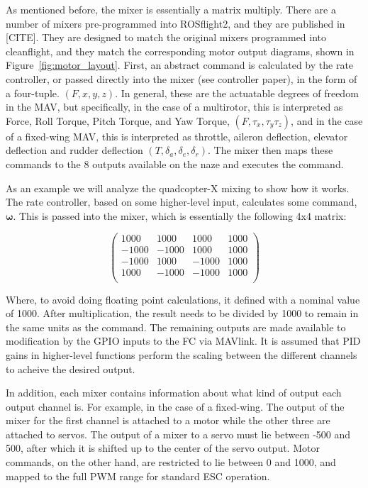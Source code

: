 \documentclass[paper=a4, fontsize=11pt]{scrartcl} %
\numberwithin{equation}{section} %
\numberwithin{figure}{section} %
\numberwithin{table}{section} %
\begin{document}
As mentioned before, the mixer is essentially a matrix multiply.  There are a number of mixers pre-programmed into ROSflight2, and they are published in [CITE].  They are designed to match the original mixers programmed into cleanflight, and they match the corresponding motor output diagrams, shown in Figure~\ref{fig:motor_layout}. First, an abstract command is calculated by the rate controller, or passed directly into the mixer (see controller paper), in the form of a four-tuple.  $(F, x, y, z)$.  In general, these are the actuatable degrees of freedom in the MAV, but specifically, in the case of a multirotor, this is interpreted as Force, Roll Torque, Pitch Torque, and Yaw Torque, $(F, \tau_x, \tau_y \tau_z)$, and in the case of a fixed-wing MAV, this is interpreted as throttle, aileron deflection, elevator deflection and rudder deflection $(T, \delta_a, \delta_e, \delta_r)$.  The mixer then maps these commands to the 8 outputs available on the naze and executes the command.

As an example we will analyze the quadcopter-X mixing to show how it works.  The rate controller, based on some higher-level input, calculates some command, $\bm{\omega}$.  This is passed into the mixer, which is essentially the following 4x4 matrix:

\begin{equation}
	\begin{pmatrix}
		 1000 & 1000 & 1000 & 1000 \\
	  -1000 &-1000 & 1000 & 1000 \\
	  -1000 & 1000 &-1000 & 1000 \\
	   1000 &-1000 &-1000 & 1000 \\
	\end{pmatrix}
\end{equation}

Where, to avoid doing floating point calculations, it defined with a nominal value of 1000.  After multiplication, the result needs to be divided by 1000 to remain in the same units as the command.  The remaining outputs are made available to modification by the GPIO inputs to the FC via MAVlink.  It is assumed that PID gains in higher-level functions perform the scaling between the different channels to acheive the desired output.

In addition, each mixer contains information about what kind of output each output channel is.  For example, in the case of a fixed-wing.  The output of the mixer for the first channel is attached to a motor while the other three are attached to servos.  The output of a mixer to a servo must lie between -500 and 500, after which it is shifted up to the center of the servo output.  Motor commands, on the other hand, are restricted to lie between 0 and 1000, and mapped to the full PWM range for standard ESC operation.
\end{document}
